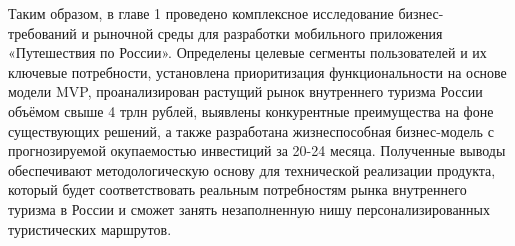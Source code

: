\noindent Таким образом, в главе 1 проведено комплексное исследование бизнес-требований и рыночной среды для разработки мобильного приложения «Путешествия по России». Определены целевые сегменты пользователей и их ключевые потребности, установлена приоритизация функциональности на основе модели MVP, проанализирован растущий рынок внутреннего туризма России объёмом свыше 4 трлн рублей, выявлены конкурентные преимущества на фоне существующих решений, а также разработана жизнеспособная бизнес-модель с прогнозируемой окупаемостью инвестиций за 20-24 месяца. Полученные выводы обеспечивают методологическую основу для технической реализации продукта, который будет соответствовать реальным потребностям рынка внутреннего туризма в России и сможет занять незаполненную нишу персонализированных туристических маршрутов.




